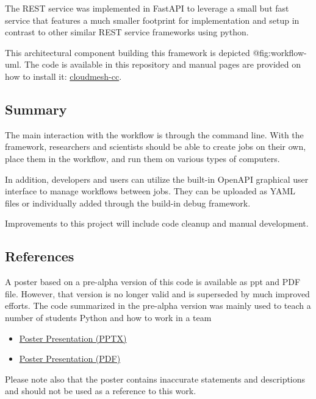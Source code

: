 The REST service was implemented in FastAPI to leverage a small but fast
service that features a much smaller footprint for implementation and
setup in contrast to other similar REST service frameworks using python.

This architectural component building this framework is depicted
@fig:workflow-uml. The code is available in this repository and manual
pages are provided on how to install it:
\href{https://github.com/cloudmesh/cloudmesh-cc}{cloudmesh-cc}.

\hypertarget{summary}{%
\subsection{Summary}\label{summary}}

The main interaction with the workflow is through the command line. With
the framework, researchers and scientists should be able to create jobs
on their own, place them in the workflow, and run them on various types
of computers.

In addition, developers and users can utilize the built-in OpenAPI
graphical user interface to manage workflows between jobs. They can be
uploaded as YAML files or individually added through the build-in debug
framework.

Improvements to this project will include code cleanup and manual
development.

\hypertarget{references}{%
\subsection{References}\label{references}}

A poster based on a pre-alpha version of this code is available as ppt
and PDF file. However, that version is no longer valid and is superseded
by much improved efforts. The code summarized in the pre-alpha version
was mainly used to teach a number of students Python and how to work in
a team

\begin{itemize}
\tightlist
\item
  \href{https://github.com/cloudmesh/cloudmesh-cc/raw/main/documents/analytics-service.pptx}{Poster
  Presentation (PPTX)}
\item
  \href{https://github.com/cloudmesh/cloudmesh-cc/raw/main/documents/analytics-service.pdf}{Poster
  Presentation (PDF)}
\end{itemize}

Please note also that the poster contains inaccurate statements and
descriptions and should not be used as a reference to this work.

